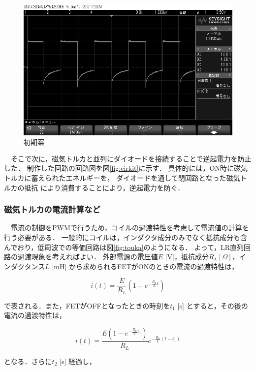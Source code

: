 \begin{figure}[H]
	\centering
		\includegraphics[scale=0.3]{./figure/scope_5.png}
		\caption{初期案}
		\label{fig:osiro1}
\end{figure}


　そこで次に，磁気トルカと並列にダイオードを接続することで逆起電力を防止した．
制作した回路の回路図を図\ref{fig:cirkit}に示す．
具体的には，ON時に磁気トルカに蓄えられたエネルギーを，
ダイオードを通して閉回路となった磁気トルカの抵抗
により消費することにより，逆起電力を防ぐ．

\subsubsection{磁気トルカの電流計算など}

　電流の制御をPWMで行うため，コイルの過渡特性を考慮して電流値の計算を行う必要がある．
一般的にコイルは，インダクタ成分のみでなく抵抗成分も含んでおり，低周波での等価回路は図\ref{fig:touka}のようになる．
よって，LR直列回路の過渡現象を考えればよい．
外部電源の電圧値$E$ [V]，抵抗成分$R_L [\Omega]$，インダクタンス$L$ [mH] から求められるFETがONのときの電流の過渡特性は，

\begin{equation}
	i(t) = \frac{E}{R_L}\left(1-e^{-\frac{R_L}{L}t}\right)
\end{equation}

で表される．また，FETがOFFとなったときの時刻を$t_1$ [s] とすると，その後の電流の過渡特性は，

\begin{equation}
	i(t) = \frac{E\left(1-e^{-\frac{R_L}{L}t_1}\right)}{R_L}e^{-\frac{R_L}{L}(t-t_1)}
\end{equation}

となる．さらに$t_2$ [s] 経過し，

